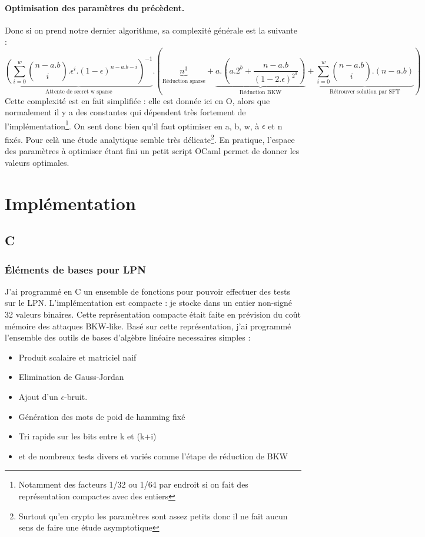 \documentclass{article}		%
\theoremstyle{definition}
\theoremstyle{plain}
\begin{document}
\paragraph{Optimisation des paramètres du précèdent.}
Donc si on prend notre dernier algorithme, sa complexité générale est
la suivante :
$$\underbrace{(\sum_{i=0}^{w}\binom{n-a.b}{i}.\epsilon^i.(1-\epsilon)^{n-a.b-i})^{-1}}_{\text{Attente
de secret w sparse}}.
(\underbrace{n^3}_{\text{Réduction sparse}} +
\underbrace{a.(a.2^b+\frac{n-a.b}{(1-2.\epsilon)^{2^a}})
}_{\text{Réduction BKW}} + \underbrace{\sum_{i=0}^w \binom{n-a.b}{i}.(n-a.b)}_{\text{Rétrouver solution par SFT}} )$$ 
Cette complexité est en fait simplifiée : elle est donnée ici en O, alors
que normalement il y a des constantes qui dépendent très fortement de
l'implémentation\footnote{Notamment des facteurs 1/32 ou 1/64 par
endroit si on fait des représentation compactes avec des entiers}. On sent
donc bien qu'il faut optimiser en a, b, w, à $\epsilon$ et n fixés. Pour
celà une étude analytique semble très délicate\footnote{Surtout qu'en
crypto les paramètres sont assez petits donc il ne fait aucun sens de
faire une étude asymptotique}. En pratique, l'espace des paramètres à
optimiser étant fini un petit script OCaml permet de donner les valeurs
optimales. 
\section{Implémentation}
\subsection{C}
\subsubsection{Éléments de bases pour LPN}
J'ai programmé en C un ensemble de fonctions pour pouvoir effectuer des
tests sur le LPN. L'implémentation est compacte : je stocke dans un
entier non-signé 32 valeurs binaires. Cette représentation compacte était
faite en prévision du coût mémoire des attaques BKW-like. Basé sur cette représentation, j'ai
programmé l'ensemble des outils de bases d'algèbre linéaire necessaires
simples :
\\
\begin{itemize}
\item Produit scalaire et matriciel naif 
\item Elimination de Gauss-Jordan
\item Ajout d'un $\epsilon$-bruit.
\item Génération des mots de poid de hamming fixé
\item Tri rapide sur les bits entre k et (k+i)
\item et de nombreux tests divers et variés comme l'étape de réduction de
BKW
\end{itemize}
\end{document}
